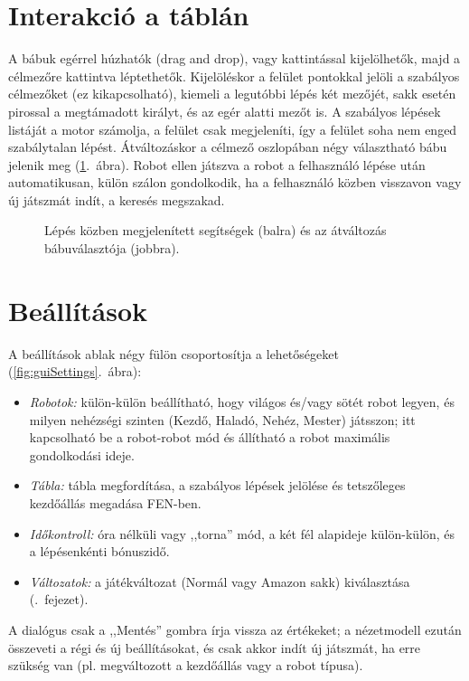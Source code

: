 \section{Interakció a táblán}

A bábuk egérrel húzhatók (drag and drop), vagy kattintással kijelölhetők, majd a célmezőre kattintva léptethetők. Kijelöléskor a felület pontokkal jelöli a szabályos célmezőket (ez kikapcsolható), kiemeli a legutóbbi lépés két mezőjét, sakk esetén pirossal a megtámadott királyt, és az egér alatti mezőt is. A szabályos lépések listáját a motor számolja, a felület csak megjeleníti, így a felület soha nem enged szabálytalan lépést. Átváltozáskor a célmező oszlopában négy választható bábu jelenik meg (\ref{fig:guiPlay}.~ábra). Robot ellen játszva a robot a felhasználó lépése után automatikusan, külön szálon gondolkodik, ha a felhasználó közben visszavon vagy új játszmát indít, a keresés megszakad.

\begin{figure}[H]
	\centering
	\hfill
	\caption{Lépés közben megjelenített segítségek (balra) és az átváltozás bábuválasztója (jobbra).}
	\label{fig:guiPlay}
\end{figure}

\section{Beállítások}

A beállítások ablak négy fülön csoportosítja a lehetőségeket (\ref{fig:guiSettings}.~ábra):
\begin{itemize}
	\item \emph{Robotok:} külön-külön beállítható, hogy világos és/vagy sötét robot legyen, és milyen nehézségi szinten (Kezdő, Haladó, Nehéz, Mester) játsszon; itt kapcsolható be a robot-robot mód és állítható a robot maximális gondolkodási ideje.
	\item \emph{Tábla:} tábla megfordítása, a szabályos lépések jelölése és tetszőleges kezdőállás megadása FEN-ben.
	\item \emph{Időkontroll:} óra nélküli vagy ,,torna'' mód, a két fél alapideje külön-külön, és a lépésenkénti bónuszidő.
	\item \emph{Változatok:} a játékváltozat (Normál vagy Amazon sakk) kiválasztása (.~fejezet).
\end{itemize}
A dialógus csak a ,,Mentés'' gombra írja vissza az értékeket; a nézetmodell ezután összeveti a régi és új beállításokat, és csak akkor indít új játszmát, ha erre szükség van (pl. megváltozott a kezdőállás vagy a robot típusa).

